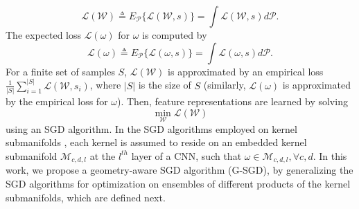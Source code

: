 \documentclass[10pt,journal,compsoc]{IEEEtran}
\theoremstyle{definition}
\theoremstyle{definition}
\theoremstyle{remark}
\theoremstyle{remark}
\theoremstyle{remark}
\begin{document}
\begin{equation}
\mathcal{L}(\mathcal{W}) \triangleq E_{\mathcal{P}} \{ {\mathcal{L}}(\mathcal{W},s) \} = \int {\mathcal{L}}(\mathcal{W},s) d \mathcal{P}.
\label{eq:expected_cost}
\end{equation}
The expected loss $\mathcal{L}(\omega)$ for $\omega$ is computed by 
\begin{equation}
\mathcal{L}(\mathcal{\omega}) \triangleq E_{\mathcal{P}} \{ {\mathcal{L}}(\mathcal{\omega},s) \} = \int {\mathcal{L}}(\mathcal{\omega},s) d \mathcal{P}.
\label{eq:expected_w_scost}
\end{equation}
 For a finite set of samples $S$,  $\mathcal{L}(\mathcal{W})$ is approximated by an empirical loss $\frac{1}{|S|} \sum_{i=1}^{|S|} \mathcal{L}(\mathcal{W},s_i)$, where $|S|$ is the size of $S$ (similarly, $\mathcal{L}(\omega)$ is approximated by the empirical loss for $\omega$). Then, feature representations are learned by solving
\begin{equation}
\min_{\mathcal{W}} \mathcal{L}(\mathcal{W})
\label{eq:opt1}
\end{equation}
using an SGD algorithm. In the SGD algorithms employed on kernel submanifolds \cite{haaai,huang162,oo16}, each kernel is assumed to reside on an embedded kernel submanifold $\mathcal{M}_{c,d,l}$ at the $l^{th}$ layer of a CNN, such that ${\omega \in \mathcal{M}_{c,d,l}}, \forall c,d$. In this work, we propose a geometry-aware SGD algorithm (G-SGD), by generalizing the SGD algorithms \cite{haaai,huang162,oo16} for optimization on ensembles of different products of the kernel submanifolds, which are defined next.
\end{document}

